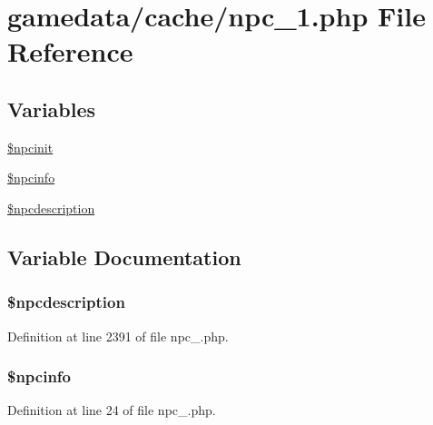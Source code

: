 \hypertarget{npc__1_8php}{\section{gamedata/cache/npc\+\_\+1.php File Reference}
\label{npc__1_8php}
}
\subsection*{Variables}
\begin{DoxyCompactItemize}
\item 
\hyperlink{npc__1_8php_a38bd0e87b769bab492d83ad186789abd}{\$npcinit}
\item 
\hyperlink{npc__1_8php_a50b1af87475edb35658b4319396473ee}{\$npcinfo}
\item 
\hyperlink{npc__1_8php_a8bb8077d354c08f3e003a5198e64625c}{\$npcdescription}
\end{DoxyCompactItemize}


\subsection{Variable Documentation}
\hypertarget{npc__1_8php_a8bb8077d354c08f3e003a5198e64625c}{
\subsubsection[{\$npcdescription}]{\setlength{\rightskip}{0pt plus 5cm}\$npcdescription}}\label{npc__1_8php_a8bb8077d354c08f3e003a5198e64625c}


Definition at line 2391 of file npc\+\_.\+php.

\hypertarget{npc__1_8php_a50b1af87475edb35658b4319396473ee}{
\subsubsection[{\$npcinfo}]{\setlength{\rightskip}{0pt plus 5cm}\$npcinfo}}\label{npc__1_8php_a50b1af87475edb35658b4319396473ee}


Definition at line 24 of file npc\+\_.\+php.

